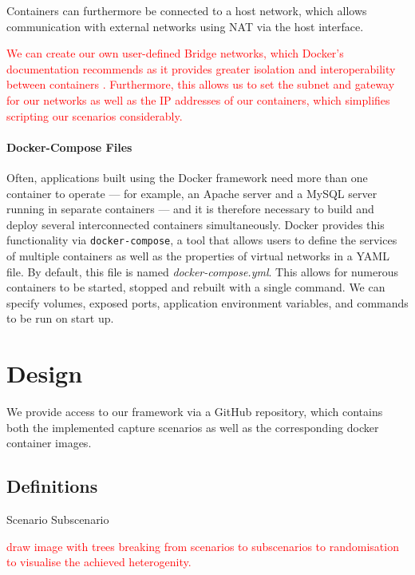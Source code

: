 \documentclass[sigconf,anonymous]{acmart}\usepackage[]{graphicx}\usepackage[]{color}
\begin{document}
Containers can furthermore be connected to a host network, which allows communication with external networks using NAT via the host interface.

\textcolor{red}{We can create our own user-defined Bridge networks, which Docker's documentation recommends as it provides greater isolation and interoperability between containers \cite{docker_docs}. Furthermore, this allows us to set the subnet and gateway for our networks as well as the IP addresses of our containers, which simplifies scripting our scenarios considerably.}




\paragraph*{Docker-Compose Files}

Often, applications built using the Docker framework need more than one container to operate --- for example, an Apache server and a MySQL server running in separate containers --- and it is therefore necessary to build and deploy several interconnected containers simultaneously. Docker provides this functionality via \texttt{docker-compose}, a tool that allows users to define the services of multiple containers as well as the properties of virtual networks in a YAML file. By default, this file is named \textit{docker-compose.yml}. This allows for numerous containers to be started, stopped and rebuilt with a single command. We can specify volumes, exposed ports, application environment variables, and commands to be run on start up.  



\section{Design}

We provide access to our framework via a GitHub repository, which contains both the implemented capture scenarios as well as the corresponding docker container images.

\subsection{Definitions}

Scenario
Subscenario

\textcolor{red}{draw image with trees breaking from scenarios to subscenarios to randomisation to visualise the achieved heterogenity.}
\end{document}

